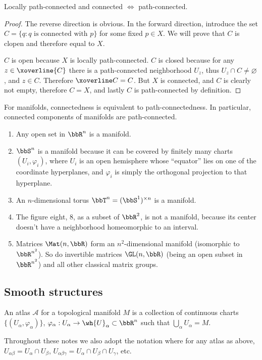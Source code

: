 \begin{lem}
Locally path-connected and connected $\Leftrightarrow$ path-connected.
\end{lem}
\begin{proof}
The reverse direction is obvious. In the forward direction, introduce the set $C=\{q:q\text{ is connected with }p\}$  for some fixed $p\in X$. We will prove that $C$ is clopen and therefore equal to $X$.

$C$ is open because $X$ is locally path-connected.
$C$ is closed because for any $z\in\xoverline{C}$ there is a path-connected neighborhood $U_z$, thus $U_z\cap C\neq \varnothing$, and $z\in C$. Therefore $\xoverline C=C$. 
But $X$ is connected, and $C$ is clearly not empty, therefore $C=X$, and lastly $C$ is path-connected by definition.
\end{proof}
\begin{cor}
For manifolds, connectedness is equivalent to path-connectedness. In particular, connected components of manifolds are path-connected.
\end{cor}

\begin{example}
\begin{enumerate}
    \item Any open set in $\bbR^n$ is a manifold.
    \item $\bbS^n$ is a manifold because it can be covered by finitely many charts $(U_i,\varphi_i)$, where $U_i$ is an open hemisphere whose ``equator'' lies on one of the coordinate hyperplanes, and $\varphi_i$ is simply the orthogonal projection to that hyperplane.
    \item An $n$-dimensional torus $\bbT^n=(\bbS^1)^{\times n}$ is a manifold.
    \item The figure eight, 8, as a subset of $\bbR^2$, is not a manifold, because its center doesn't have a neighborhood homeomorphic to an interval.
    \item Matrices $\Mat(n,\bbR )$ form an $n^2$-dimensional manifold (isomorphic to $\bbR^{n^2}$). So do invertible matrices $\GL(n,\bbR )$ (being an open subset in $\bbR^{n^2}$) and all other classical matrix groups.
\end{enumerate}
\end{example}

\subsection{Smooth structures}
\begin{defn}[Atlas]
An atlas $\mathcal{A}$ for a topological manifold $M$ is a collection of continuous charts $\{(U_\alpha,\varphi_\alpha)\}$, $\varphi_\alpha:U_\alpha\to \wh{U}_\alpha \subset \bbR^n$ such that $\bigcup_\alpha U_\alpha =M$.
\end{defn}
Throughout these notes we also adopt the notation where for any atlas as above, $U_{\alpha\beta}=U_\alpha \cap U_\beta$, $U_{\alpha\beta\gamma}=U_\alpha \cap U_\beta \cap U_\gamma$, etc.

